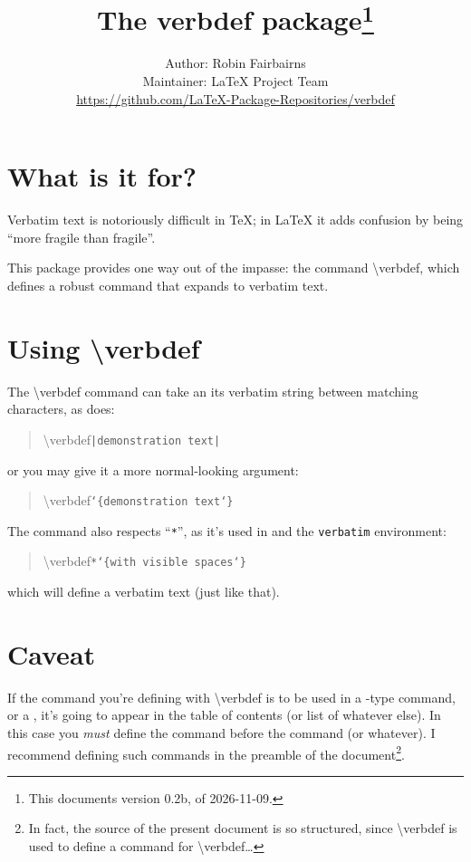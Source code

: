 \documentclass[a4paper]{l3in2edoc}
\def\verbdefcmd{\textbackslash verbdef}%
\begin{document}
\title{The \textsf{verbdef} package\thanks{This documents version 0.2b, of
    2026-11-09.}}
\author{%
  Author: Robin Fairbairns\\
  Maintainer: \LaTeX{} Project Team\\
  \normalsize
  \url{https://github.com/LaTeX-Package-Repositories/verbdef}%
  }
\maketitle

\DeleteShortVerb{\|}%

\section{What is it for?}

Verbatim text is notoriously difficult in \TeX{}; in \LaTeX{} it adds
confusion by being ``more fragile than fragile''.

This package provides one way out of the impasse: the command
\verbdefcmd, which defines a robust command that expands to verbatim
text.

\section{Using \verbdefcmd}

The \verbdefcmd{} command can take an its verbatim string between
matching characters, as  does:
\begin{quote}
\verbdefcmd{}\texttt{|demonstration text|}
\end{quote}
or you may give it a more normal-looking argument:
\begin{quote}
  \verbdefcmd{}\texttt{\char`\{demonstration text\char`\}}
\end{quote}

The command also respects ``\texttt{*}'', as it's used in 
and the \texttt{verbatim} environment:
\begin{quote}
  \verbdefcmd\texttt{*}\texttt{\char`\{with visible spaces\char`\}}
\end{quote}
%
\verbdef*{}%
which will define a verbatim text \stardemo{} (just like that).

\section{Caveat}

If the command you're defining with \verbdefcmd{} is to be used in a
-type command, or a , it's going to appear in
the table of contents (or list of whatever else).  In this case you
\emph{must} define the command before the  command
(or whatever).  I recommend defining such commands in the preamble of
the document\footnote{In fact, the source of the present document is
  so structured, since \verbdefcmd{} is used to define a command for
  \verbdefcmd\dots}.
\end{document}
